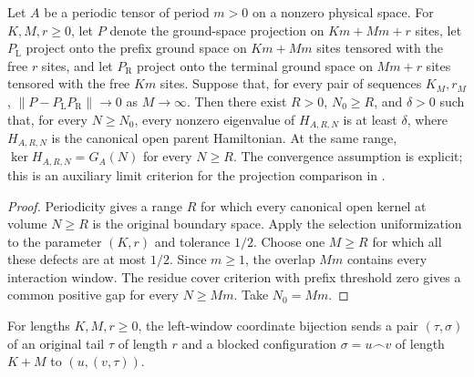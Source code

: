 \begin{lemma}
    \label{thm:open_gap_residue_cover_limit}
    \leanok
    Let $A$ be a periodic tensor of period $m>0$ on a nonzero physical space.
    For $K,M,r\geq0$, let $P$ denote the ground-space projection on
    $Km+Mm+r$ sites, let $P_{\mathrm L}$ project onto the prefix ground
    space on $Km+Mm$ sites tensored with the free $r$ sites, and let
    $P_{\mathrm R}$ project onto the terminal ground space on $Mm+r$ sites
    tensored with the free $Km$ sites.
    Suppose that, for every pair of sequences $K_M,r_M$,
    $\|P-P_{\mathrm L}P_{\mathrm R}\|\to0$ as $M\to\infty$.
    Then there exist $R>0$, $N_0\geq R$, and $\delta>0$ such that, for
    every $N\geq N_0$, every nonzero eigenvalue of $H_{A,R,N}$ is at least
    $\delta$, where $H_{A,R,N}$ is the canonical open parent Hamiltonian.
    At the same range, $\ker H_{A,R,N}=G_A(N)$ for every $N\geq R$.
    The convergence assumption is explicit; this is an auxiliary limit
    criterion for the projection comparison in
    \cite[Section~6, Lemma~commutation(ii)]{Nachtergaele1996Spectral}.
\end{lemma}
\begin{proof}\leanok
    Periodicity gives a range $R$ for which every canonical open kernel at
    volume $N\geq R$ is the original boundary space.
    Apply the selection uniformization to the parameter $(K,r)$ and tolerance
    $1/2$. Choose one $M\geq R$ for which all these defects are at most
    $1/2$. Since $m\geq1$, the overlap $Mm$ contains every interaction window.
    The residue cover criterion with prefix threshold zero gives a common
    positive gap for every $N\geq Mm$. Take $N_0=Mm$.
\end{proof}

\begin{definition}
    \label{def:residual_window_left_config_equiv}
    \leanok
    For lengths $K,M,r\geq0$, the left-window coordinate bijection sends a
    pair $(\tau,\sigma)$ of an original tail $\tau$ of length $r$ and a
    blocked configuration $\sigma=u\mathbin{\frown}v$ of length $K+M$ to
    $(u,(v,\tau))$.
\end{definition}

